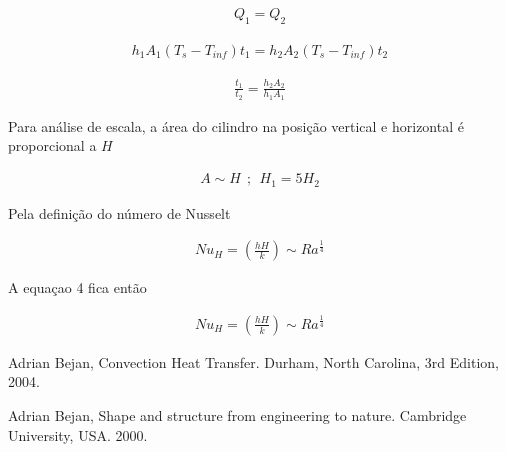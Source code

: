 \documentclass[12pt]{article}
\begin{document}
\begin{equation}
	\begin{aligned}
		Q_{1} = Q_{2}
	\end{aligned}
\end{equation}

\begin{equation}
	\begin{aligned}
		h_{1}A_{1}(T_{s}-T_{inf})t_{1} = h_{2}A_{2}(T_{s}-T_{inf})t_{2}
	\end{aligned}
\end{equation}

\begin{equation}
	\begin{aligned}
		\frac{t_{1} }{t_{2}}= \frac{h_{2}A_{2}}{h_{1}A_{1}}
	\end{aligned}
\end{equation}

Para análise de escala, a área do cilindro na posição vertical e horizontal é proporcional a $H$

\begin{equation}
	\begin{aligned}
		A \sim H \ \ ; \ \ H_{1} = 5H_{2}
	\end{aligned}
\end{equation}

Pela definição do número de Nusselt

\begin{equation}
	\begin{aligned}
		Nu_{H} = \left( \frac{hH}{k}\right) \sim Ra^{\frac{1}{4}}
	\end{aligned}
\end{equation}

A equaçao 4 fica então

\begin{equation}
	\begin{aligned}
		Nu_{H} = \left( \frac{hH}{k}\right) \sim Ra^{\frac{1}{4}}
	\end{aligned}
\end{equation}




















\begin{thebibliography}{999}
	
	
	Adrian Bejan,
	Convection Heat Transfer.
	Durham, North Carolina,
	3rd Edition,
	2004.
	
	Adrian Bejan,
	Shape and structure from engineering to nature.
	Cambridge University, USA.
	2000.
	
\end{thebibliography}
\end{document}
